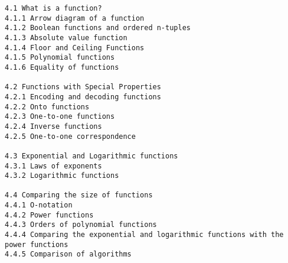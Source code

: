 \documentclass[a4paper,12pt]{article}
\begin{document}
\begin{verbatim}
4.1 What is a function?      
4.1.1 Arrow diagram of a function   
4.1.2 Boolean functions and ordered n-tuples   
4.1.3 Absolute value function   
4.1.4 Floor and Ceiling Functions    
4.1.5 Polynomial functions    
4.1.6 Equality of functions  

4.2 Functions with Special Properties    
4.2.1 Encoding and decoding functions    
4.2.2 Onto functions     
4.2.3 One-to-one functions    
4.2.4 Inverse functions     
4.2.5 One-to-one correspondence   

4.3 Exponential and Logarithmic functions    
4.3.1 Laws of exponents     
4.3.2 Logarithmic functions
    
4.4 Comparing the size of functions    
4.4.1 O-notation     
4.4.2 Power functions    
4.4.3 Orders of polynomial functions    
4.4.4 Comparing the exponential and logarithmic functions with the power functions
4.4.5 Comparison of algorithms 
\end{verbatim}
\end{document}

